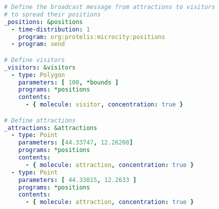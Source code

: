 \begin{lstlisting}[language=yaml, label={lst:positions}, caption=Assign the \texttt{org:protelis:microcity:positions} behaviour to 100 visitors and 2 attractions.]
# Define the broadcast message from attractions to visitors
# to spread their positions
_positions: &positions
  - time-distribution: 1
    program: org:protelis:microcity:positions
  - program: send

# Define visitors
_visitors: &visitors
  - type: Polygon
    parameters: [ 100, *bounds ]
    programs: *positions
    contents:
      - { molecule: visitor, concentration: true }

# Define attractions
_attractions: &attractions
  - type: Point
    parameters: [44.33747, 12.26208]
    programs: *positions
    contents:
      - { molecule: attraction, concentration: true }
  - type: Point
    parameters: [ 44.33815, 12.2633 ]
    programs: *positions
    contents:
      - { molecule: attraction, concentration: true }
\end{lstlisting}
